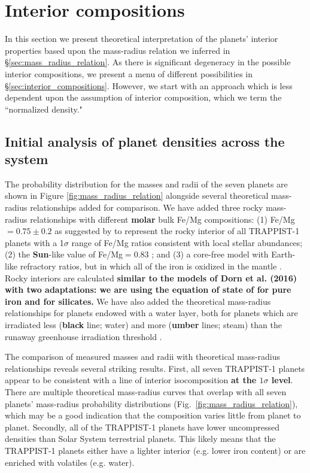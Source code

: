 \documentclass[twocolumn]{aastex63}
\begin{document}
\section{Interior compositions}
\label{sec:theoretical_interpretation}

In this section we present theoretical interpretation of the planets'
interior properties based upon the mass-radius relation we inferred in \S \ref{sec:mass_radius_relation}.  As there is significant degeneracy in the possible interior compositions, we present a menu of different possibilities in \S \ref{sec:interior_compositions}.  However, we start with an approach which is less dependent upon the assumption of interior composition, which we term the ``normalized density."

\subsection{Initial analysis of planet densities across the system}

The probability distribution for the masses and radii of the seven planets are shown in Figure \ref{fig:mass_radius_relation} alongside several theoretical mass-radius relationships added for comparison.
We have added three rocky mass-radius relationships with different \textbf{molar} bulk Fe/Mg compositions:  (1) Fe/Mg$ =0.75{\pm} 0.2$ as suggested by \citet{Unterborn2018a} to represent the rocky interior of all TRAPPIST-1 planets with a 1$\sigma$ range of Fe/Mg ratios consistent with local stellar abundances;  (2) the \textbf{Sun}-like value of Fe/Mg$ = 0.83$ \citep{Lodders2009}; and (3) a core-free model with Earth-like refractory ratios, but in which all of the iron is oxidized in the mantle \citep{ElkinsTanton2008}. Rocky interiors are calculated \textbf{similar to the models of Dorn et al. (2016) with two adaptations: we are using the equation of state of \citet{Hakim2018} for pure iron and \citet{Sotin2007} for silicates.} We have also added the theoretical mass-radius relationships for planets endowed with a water layer, both for planets which are irradiated less (\textbf{black} line; water) and more (\textbf{umber} lines; steam) than the runaway greenhouse irradiation threshold \citep{Turbet2020}.

The comparison of measured masses and radii with theoretical mass-radius relationships reveals several striking results. First, all seven TRAPPIST-1 planets appear to be consistent with a line of interior isocomposition \textbf{at the $1\sigma$ level}. There are multiple theoretical mass-radius curves that overlap with all seven planets' mass-radius probability distributions (Fig.\ \ref{fig:mass_radius_relation}), which may be a good indication that the composition varies little from planet to planet. Secondly, all of the TRAPPIST-1 planets have lower uncompressed densities than Solar System terrestrial planets. This likely means that the TRAPPIST-1 planets either have a lighter interior (e.g. lower iron content) or are enriched with volatiles (e.g. water).
\end{document}
